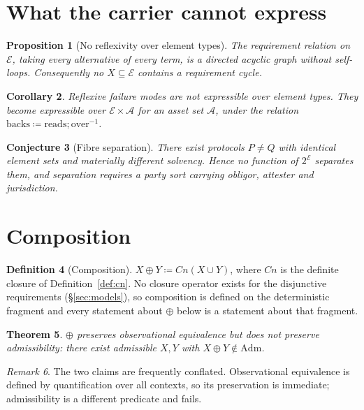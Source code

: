 \documentclass[11pt]{article}
\theoremstyle{definition}
\newtheorem{definition}{Definition}[section]
\theoremstyle{plain}
\newtheorem{theorem}[definition]{Theorem}
\newtheorem{proposition}[definition]{Proposition}
\newtheorem{corollary}[definition]{Corollary}
\newtheorem{conjecture}[definition]{Conjecture}
\theoremstyle{remark}
\newtheorem{remark}[definition]{Remark}
\newcommand{\Adm}{\mathrm{Adm}}
\newcommand{\El}{\mathcal{E}}
\begin{document}
\section{What the carrier cannot express}

\begin{proposition}[No reflexivity over element types]\label{prop:dag}
The requirement relation on $\El$, taking every alternative of every term, is a
directed acyclic graph without self-loops. Consequently no $X \subseteq \El$
contains a requirement cycle.
\end{proposition}

\begin{corollary}
Reflexive failure modes are not expressible over element types. They become
expressible over $\El \times \mathcal{A}$ for an asset set $\mathcal{A}$, under
the relation $\mathrm{backs} \coloneqq \mathrm{reads} \mathbin{;} \mathrm{over}^{-1}$.
\end{corollary}

\begin{conjecture}[Fibre separation]\label{conj:fibre}
There exist protocols $P \neq Q$ with identical element sets and materially
different solvency. Hence no function of $2^{\El}$ separates them, and separation
requires a party sort carrying obligor, attester and jurisdiction.
\end{conjecture}

\section{Composition}

\begin{definition}[Composition]\label{def:oplus}
$X \oplus Y \coloneqq Cn(X \cup Y)$, where $Cn$ is the definite closure of
Definition~\ref{def:cn}. No closure operator exists for the disjunctive
requirements (\S\ref{sec:models}), so composition is defined on the deterministic
fragment and every statement about $\oplus$ below is a statement about that
fragment.
\end{definition}

\begin{theorem}\label{thm:noncong}
$\oplus$ preserves observational equivalence but does not preserve
admissibility: there exist admissible $X, Y$ with $X \oplus Y \notin \Adm$.
\end{theorem}

\begin{remark}
The two claims are frequently conflated. Observational equivalence is defined by
quantification over all contexts, so its preservation is immediate; admissibility
is a different predicate and fails.
\end{remark}
\end{document}
